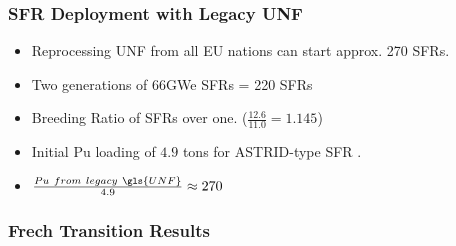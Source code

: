 \begin{frame}
	\frametitle{SFR Deployment with Legacy UNF}
	\begin{itemize}
		\item Reprocessing UNF from all EU nations can start approx. 270 SFRs.
		\item Two generations of 66GWe SFRs = 220 SFRs
		\item Breeding Ratio of SFRs over one. ($\frac{12.6}{11.0} = 1.145$)
		\item Initial Pu loading of $4.9$ tons for ASTRID-type SFR \cite{marsaultmarie-sophie_pre-conceptual_2012}.
		\item $\frac{Pu \ from \ legacy \ \gls{UNF}}{4.9} \approx 270$
	\end{itemize}
\end{frame}

\begin{frame}
	\frametitle{Frech Transition Results}
	
\begin{table}[h]
	\centering
		\caption {\gls{SFR} Simulation Results}
		\label{tab:sfr_sim_result}
\end {table}


\end{frame}

